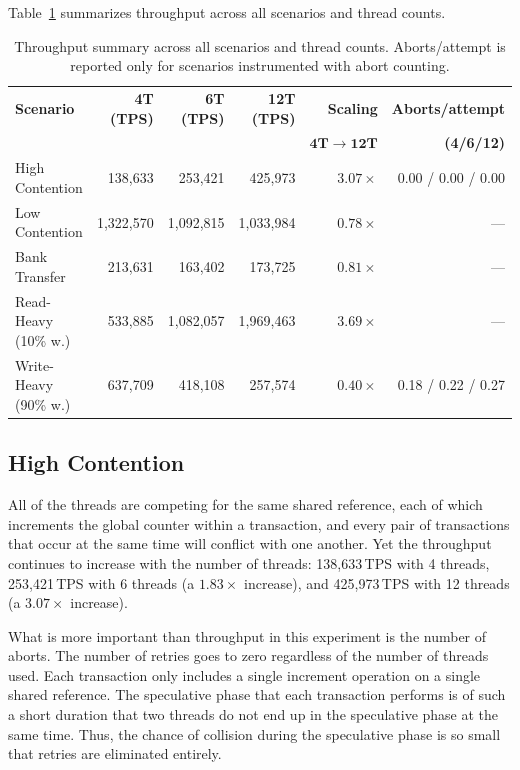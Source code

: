 Table~\ref{tab:throughput-summary} summarizes throughput across all scenarios
and thread counts.

\begin{table}[H]
  \centering
  \caption{Throughput summary across all scenarios and thread counts.
    Aborts/attempt is reported only for scenarios instrumented with abort
    counting.}
  \label{tab:throughput-summary}
  \begin{tabular}{@{}l r r r r r@{}}
    \toprule
    \textbf{Scenario}     &
    \textbf{4T (TPS)}     &
    \textbf{6T (TPS)}     &
    \textbf{12T (TPS)}    &
    \textbf{Scaling}      &
    \textbf{Aborts/attempt}                                                                                \\
                          &           &           &           & $\mathbf{4T{\to}12T}$ & \textbf{(4/6/12)}  \\
    \midrule
    High Contention       & 138,633   & 253,421   & 425,973   & $3.07\times$          & 0.00 / 0.00 / 0.00 \\
    Low Contention        & 1,322,570 & 1,092,815 & 1,033,984 & $0.78\times$          & ---                \\
    Bank Transfer         & 213,631   & 163,402   & 173,725   & $0.81\times$          & ---                \\
    Read-Heavy (10\% w.)  & 533,885   & 1,082,057 & 1,969,463 & $3.69\times$          & ---                \\
    Write-Heavy (90\% w.) & 637,709   & 418,108   & 257,574   & $0.40\times$          & 0.18 / 0.22 / 0.27 \\
    \bottomrule
  \end{tabular}
\end{table}

\subsection{High Contention}

All of the threads are competing for the same shared reference, each of
which increments the global counter within a transaction, and every pair
of transactions that occur at the same time will conflict with one
another. Yet the throughput
continues to increase with the number of threads: 138,633\,TPS with 4
threads, 253,421\,TPS with 6 threads (a $1.83\times$ increase), and
425,973\,TPS with 12 threads (a $3.07\times$ increase).

What is more important than throughput in this experiment is the number
of aborts. The number of retries goes to zero regardless of the number of
threads used. Each transaction only includes a single increment operation
on a single shared reference. The speculative phase that each transaction
performs is of such a short duration that two threads do not end up in
the speculative phase at the same time. Thus, the chance of collision
during the speculative phase is so small that retries are eliminated
entirely.

